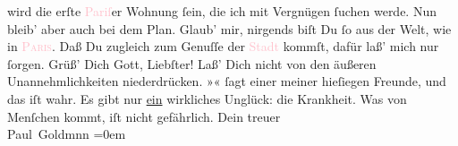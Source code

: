                wird die erſte \textcolor{pink}{Pariſ}{}\ledrightnote{\textcolor{pink}{Paris}}er Wohnung ſein, die ich mit
               Vergnügen ſuchen werde.\pend
           \pstart
           Nun bleib’ aber auch bei dem Plan. Glaub’ mir, nirgends biſt Du ſo aus der Welt, wie
               in \textsc{\textcolor{pink}{Paris}{}\ledrightnote{\textcolor{pink}{Paris}}}. Daß Du zugleich zum Genuſſe der \textcolor{pink}{Stadt}{} kommſt, dafür laß’ mich nur  ſorgen.\pend
           \pstart
           Grüß’ Dich Gott, Liebſter! Laß’ Dich nicht von den äußeren Unannehmlichkeiten
               niederdrücken. »\label{K_L02803-5v}\label{K_L02803-5h}« ſagt einer meiner hieſiegen Freunde, und das iſt wahr. {\pb}Es gibt nur \uline{ein}
               wirkliches Unglück: die Krankheit. Was von Menſchen kommt, iſt nicht gefährlich.\pend
           \pstart
           Dein treuer {\\[\baselineskip]}\spacefill\mbox{Paul Goldmnn}\pend
           \leftskip=0em{}\endnumbering{}  
      